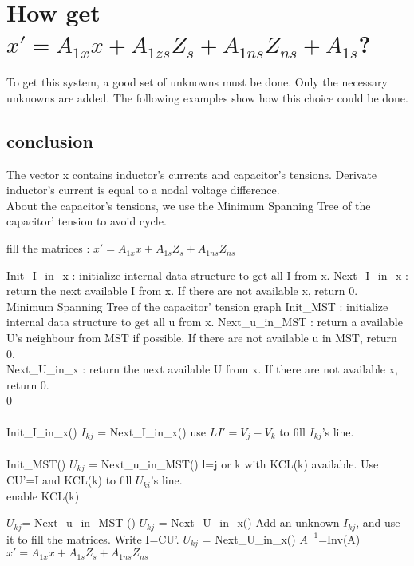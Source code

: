  

\section{How get $x' = A_{1x}x +A_{1zs}Z_{s} + A_{1ns}Z_{ns}+A_{1s}$?}
To get this system, a good set of unknowns must be done. Only the necessary unknowns are added. The
following examples show how this choice could be done.






\subsection{conclusion}
The vector x contains inductor's currents and capacitor's tensions. Derivate inductor's current is equal to a
nodal voltage difference.\\
About the capacitor's tensions, we use the Minimum Spanning Tree of the capacitor' tension to avoid cycle.\\


\begin{algorithm}
\caption{fill the matrices : $x'=A_{1x}x+A_{1s}Z_{s}+A_{1ns}Z_{ns}$ }
\begin{algorithmic}
\REQUIRE Init\_I\_in\_x : initialize internal data structure to get all I from x.
\REQUIRE Next\_I\_in\_x : return the next available I from x. If there are not available x, return 0.\\
\REQUIRE Minimum Spanning Tree of the capacitor' tension graph
\REQUIRE Init\_MST : initialize internal data structure to get all u from x.
\REQUIRE Next\_u\_in\_MST : return a available U's neighbour from MST if possible. If there are not
available u in MST, return 0.\\
\REQUIRE Next\_U\_in\_x : return the next available U from x. If there are not available x, return 0.\\

0\\
\\
\STATE Init\_I\_in\_x()
\STATE $I_{kj}$ = Next\_I\_in\_x()
\STATE use $LI'=V_{j}-V_{k}$ to fill $I_{kj}$'s line.
\ENDWHILE\\
\\
\STATE Init\_MST()
\STATE $U_{kj}$ = Next\_u\_in\_MST()
\STATE l=j or k with KCL(k) available.
\STATE Use CU'=I and KCL(k) to fill $U_{ki}$'s line.\\
\STATE enable KCL(k)

\STATE $U_{kj}$= Next\_u\_in\_MST ()
\ENDWHILE
\STATE $U_{kj}$ = Next\_U\_in\_x()
\STATE Add an unknown $I_{kj}$, and use it to fill the matrices. Write I=CU'.
\STATE $U_{kj}$ = Next\_U\_in\_x()
\ENDWHILE
{}
\STATE $A^{-1}$=Inv(A)
\STATE $x'=A_{1x}x+A_{1s}Z_{s}+A_{1ns}Z_{ns}$
\end{algorithmic}
\end{algorithm}

